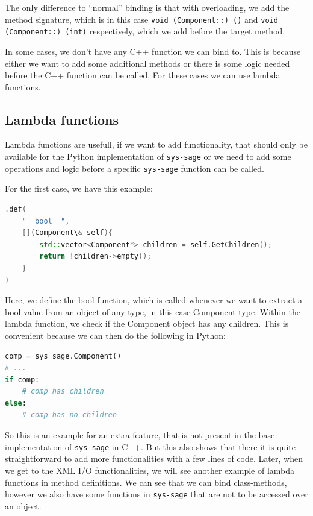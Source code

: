 The only difference to “normal” binding is that with overloading, we add the method signature, which is in this case \verb|void (Component::) ()| and \verb|void (Component::) (int)| respectively, which we add before the target method. \cite[see The Basics/Object-Oriented Code]{pybind11-docu}

\smallskip
In some cases, we don't have any C++ function we can bind to. This is because either we want to add some additional methods or there is some logic needed before the C++ function can be called. For these cases we can use lambda functions.

\subsection{Lambda functions}

Lambda functions are usefull, if we want to add functionality, that should only be available for the Python implementation of \texttt{sys-sage} or we need to add some operations and logic before a specific \texttt{sys-sage} function can be called.

For the first case, we have this example:
\newpage
\begin{lstlisting}[language=C++, xleftmargin=4em, frame = single]
.def(
    "__bool__",
    [](Component\& self){
        std::vector<Component*> children = self.GetChildren();
        return !children->empty();
    }
)
\end{lstlisting}

Here, we define the bool-function, which is called whenever we want to extract a bool value from an object of any type, in this case Component-type. Within the lambda function, we check if the Component object has any children. This is convenient because we can then do the following in Python:

\begin{lstlisting}[language=Python,xleftmargin=4em, frame = single]
comp = sys_sage.Component()
# ...
if comp:
    # comp has children
else:
    # comp has no children
\end{lstlisting}

So this is an example for an extra feature, that is not present in the base implementation of \verb|sys_sage| in C++. But this also shows that there it is quite straightforward to add more functionalities with a few lines of code. Later, when we get to the XML I/O functionalities, we will see another example of lambda functions in method definitions.
\smallskip
We can see that we can bind class-methods, however we also have some functions in \texttt{sys-sage} that are not to be accessed over an object.

